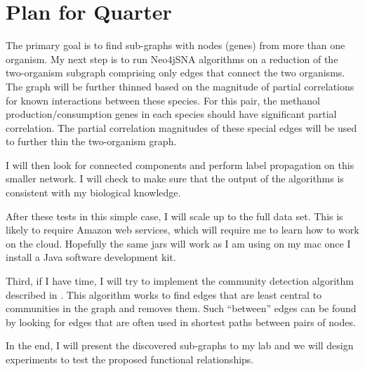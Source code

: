 \documentclass[12pt]{article}
\begin{document}
\section{Plan for Quarter}  %

The primary goal is to find sub-graphs with nodes (genes) from more than one organism. 
My next step is to run Neo4jSNA algorithms on a reduction of the two-organism subgraph comprising only edges that connect the two organisms. 
The graph will be further thinned based on the magnitude of partial correlations for known interactions between these species.
For this pair, the methanol production/consumption genes in each species should have significant partial correlation. 
The partial correlation magnitudes of these special edges will be used to further thin the two-organism graph. 

I will then look for connected components and perform label propagation on this smaller network.  
I will check to make sure that the output of the algorithms is consistent with my biological knowledge.

After these tests in this simple case, I will scale up to the full data set.
This is likely to require Amazon web services, which will require me to learn how to work on the cloud. 
Hopefully the same jars will work as I am using on my mac once I install a Java software development kit.

Third, if I have time, I will try to implement the community detection algorithm described in \cite{girvan2002community}.
This algorithm works to find edges that are least central to communities in the graph and removes them.
Such ``between'' edges can be found by looking for edges that are often used in shortest paths between pairs of nodes.

In the end, I will present the discovered sub-graphs to my lab and we will design experiments to test the proposed functional relationships.

%



 
 
\end{document}
